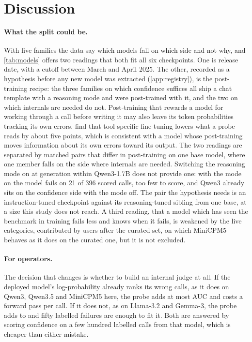 \section{Discussion}
\label{sec:discussion}

\paragraph{What the split could be.}
With five families the data say which models fall on which side and not why, and \cref{tab:models} offers two readings that both fit all six checkpoints. One is release date, with a cutoff between March and April 2025. The other, recorded as a hypothesis before any new model was extracted (\cref{app:registry}), is the post-training recipe: the three families on which confidence suffices all ship a chat template with a reasoning mode and were post-trained with it, and the two on which internals are needed do not. Post-training that rewards a model for working through a call before writing it may also leave its token probabilities tracking its own errors. \citet{yeats2026calls} find that tool-specific fine-tuning lowers what a probe reads by about five points, which is consistent with a model whose post-training moves information about its own errors toward its output. The two readings are separated by matched pairs that differ in post-training on one base model, where one member falls on the side where internals are needed. Switching the reasoning mode on at generation within Qwen3-1.7B does not provide one: with the mode on the model fails on 21 of 396 scored calls, too few to score, and Qwen3 already sits on the confidence side with the mode off. The pair the hypothesis needs is an instruction-tuned checkpoint against its reasoning-tuned sibling from one base, at a size this study does not reach. A third reading, that a model which has seen the benchmark in training fails less and knows when it fails, is weakened by the live categories, contributed by users after the curated set, on which MiniCPM5 behaves as it does on the curated one, but it is not excluded.

\paragraph{For operators.}
The decision that changes is whether to build an internal judge at all. If the deployed model's log-probability already ranks its wrong calls, as it does on Qwen3, Qwen3.5 and MiniCPM5 here, the probe adds at most \gapConfidenceMax{} AUC and costs a forward pass per call. If it does not, as on Llama-3.2 and Gemma-3, the probe adds \gapInternalsMin{} to \gapInternalsMax{} and fifty labelled failures are enough to fit it. Both are answered by scoring confidence on a few hundred labelled calls from that model, which is cheaper than either mistake.

